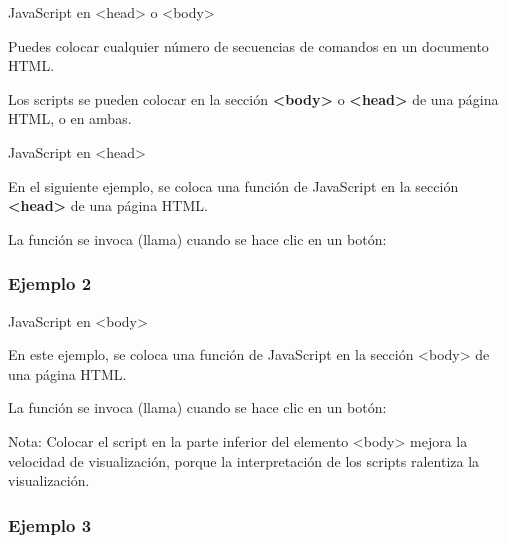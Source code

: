 \begin{frame}[c]{JavaScript en <head> o <body>}

  Puedes colocar cualquier número de secuencias de comandos
  en un documento HTML.

  \vspace{\baselineskip}
  Los scripts se pueden colocar en la sección \textbf{<body>} o
  \textbf{<head>} de una página HTML, o en ambas.
\end{frame}

\begin{frame}[c]{JavaScript en <head>}

  En el siguiente ejemplo, se coloca una función de JavaScript
  en la sección \textbf{<head>} de una página HTML.

  \vspace{\baselineskip}
  La función se invoca (llama) cuando se hace clic en un botón:
\end{frame}

\begin{frame}[fragile]
  \frametitle{Ejemplo 2}
  
\end{frame}

\begin{frame}[c]{JavaScript en <body>}

  En este ejemplo, se coloca una función de JavaScript en la
  sección <body> de una página HTML.

  \vspace{\baselineskip}
  La función se invoca (llama) cuando se hace clic en un botón:

  \vspace{\baselineskip}
  \begin{exampleblock}{Nota:}
    Colocar el script en la parte inferior del elemento <body>
    mejora la velocidad de visualización, porque la interpretación de
    los scripts ralentiza la visualización.
  \end{exampleblock}
\end{frame}

\begin{frame}[fragile]
  \frametitle{Ejemplo 3}
  
\end{frame}

